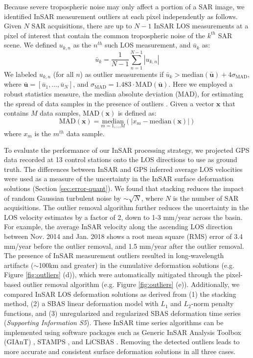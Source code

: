 Because severe tropospheric noise may only affect a portion of a SAR image, we identified InSAR measurement outliers at each pixel independently as follows. Given $N$ SAR acquisitions, there are up to $N-1$ InSAR LOS measurements at a pixel of interest that contain the common tropospheric noise of the $k^{th}$ SAR scene. We defined $u_{k,n}$ as the $n^{th}$ such LOS measurement, and $\bar{u}_k$ as:
\begin{equation}
	\bar{u}_k  = \frac{1}{N-1} \sum_{n=1}^{N-1} |u_{k,n}|  
\end{equation}
We labeled $u_{k,n}$ (for all $n$) as outlier measurements if $\bar{u}_k > \mathrm{median}(\mathbf{\bar{u}}) + 4 \sigma_{\mathrm{MAD}}$, where $\mathbf{\bar{u}}=[\bar{u}_1,...,\bar{u}_N]$, and $\sigma_{\mathrm{MAD}}=1.483 \cdot \mathrm{MAD}(\mathbf{\bar{u}})$. Here we employed a robust statistics measure, the median absolute deviation (MAD), for estimating the spread of data samples in the presence of outliers \cite{Hampel1974, Rousseeuw2011}. Given a vector $\mathbf{x}$ that contains $M$ data samples, $\mathrm{MAD}(\mathbf{x})$ is defined as:
\begin{equation}
	\mathrm{MAD}(\mathbf{x}) =  \underset{m = 1,\ldots M}{\mathrm{median}} \left( \bigr\lvert  x_m - \mathrm{median}(\mathbf{x})  \bigr\rvert \right)
\end{equation}
where $x_m$ is the $m^{th}$ data sample. 

To evaluate the performance of our InSAR processing strategy, we projected GPS data recorded at 13 control stations onto the LOS directions to use as ground truth. The differences between InSAR and GPS inferred average LOS velocities were used as a measure of the uncertainty in the InSAR surface deformation solutions (Section \ref{sec:error-quant}). We found that stacking reduces the impact of random Gaussian turbulent noise by $ \sim \sqrt{N} $, where $ N $ is the number of SAR acquisitions. The outlier removal algorithm further reduces the uncertainty in the LOS velocity estimates by a factor of 2, down to 1-3 mm/year across the basin. For example, the average InSAR velocity along the ascending LOS direction between Nov. 2014 and Jan. 2018 shows a root mean square (RMS) error of 3.4 mm/year before the outlier removal, and 1.5 mm/year after the outlier removal. The presence of InSAR measurement outliers resulted in long-wavelength artifacts ($ \sim $100km and greater) in the cumulative deformation solutions (e.g. Figure \ref{fig:outliers} (d)), which were automatically mitigated through the pixel-based outlier removal algorithm (e.g. Figure \ref{fig:outliers} (e)). Additionally, we compared InSAR LOS deformation solutions as derived from (1) the stacking method, (2) a SBAS linear deformation model with $L_1$ and $L_2$-norm penalty functions, and (3) unregularized and regularized SBAS deformation time series (\textit{Supporting Information S5}). These InSAR time series algorithms can be implemented using software packages such as Generic InSAR Analysis Toolbox (GIAnT) \citep{Agram2013NewRadarInterferometric}, STAMPS \citep{Hooper2012RecentAdvancesSar}, and LiCSBAS \citep{Morishita2020LicsbasOpenSource}. Removing the detected outliers leads to more accurate and consistent surface deformation solutions in all three cases.


